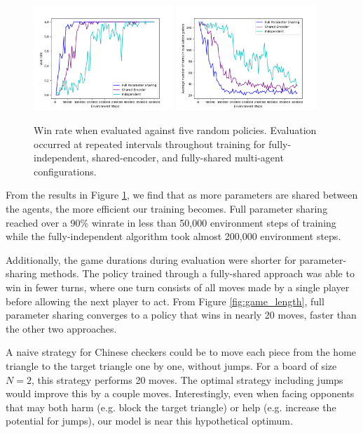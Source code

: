 \documentclass[12pt, a4paper, twocolumn]{article}
\begin{document}
\begin{figure}[ht]
  \centering
    \includegraphics[width=0.47\textwidth]{images/winrate.png}
    \includegraphics[width=0.47\textwidth]{images/game_length.png}
  \label{fig:winrate}
  \caption{Win rate when evaluated against five random policies. Evaluation occurred at repeated intervals throughout training for fully-independent, shared-encoder, and fully-shared multi-agent configurations.}
\end{figure}

From the results in Figure \ref{fig:winrate}, we find that as more parameters are shared between the agents, the more efficient our training becomes. Full parameter sharing reached over a 90\% winrate in less than 50,000 environment steps of training while the fully-independent algorithm took almost 200,000 environment steps.

Additionally, the game durations during evaluation were shorter for parameter-sharing methods. The policy trained through a fully-shared approach was able to win in fewer turns, where one turn consists of all moves made by a single player before allowing the next player to act. From Figure \ref{fig:game_length}, full parameter sharing converges to a policy that wins in nearly 20 moves, faster than the other two approaches.

A naive strategy for Chinese checkers could be to move each piece from the home triangle to the target triangle one by one, without jumps. For a board of size $N = 2$, this strategy performs 20 moves. The optimal strategy including jumps would improve this by a couple moves. Interestingly, even when facing opponents that may both harm (e.g. block the target triangle) or help (e.g. increase the potential for jumps), our model is near this hypothetical optimum.
\end{document}
